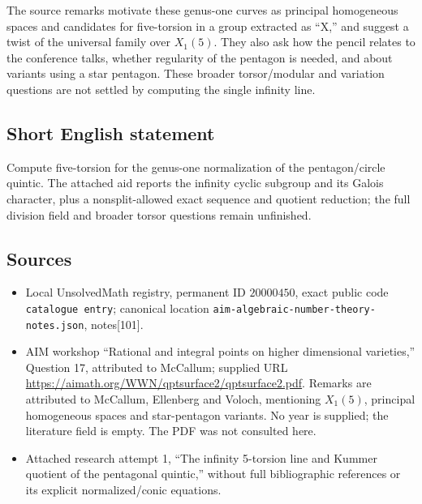 \documentclass[11pt]{article}
\begin{document}
The source remarks motivate these genus-one curves as principal homogeneous spaces and candidates for five-torsion in a group extracted as ``X,'' and suggest a twist of the universal family over \(X_1(5)\). They also ask how the pencil relates to the conference talks, whether regularity of the pentagon is needed, and about variants using a star pentagon. These broader torsor/modular and variation questions are not settled by computing the single infinity line.
\subsection{Short English statement}
Compute five-torsion for the genus-one normalization of the pentagon/circle quintic. The attached aid reports the infinity cyclic subgroup and its Galois character, plus a nonsplit-allowed exact sequence and quotient reduction; the full division field and broader torsor questions remain unfinished.
\subsection{Sources}
\begin{itemize}
\item Local UnsolvedMath registry, permanent ID \(20000450\), exact public code \texttt{catalogue entry}; canonical location \texttt{aim-algebraic-number-theory-notes.json}, notes[101].
\item AIM workshop ``Rational and integral points on higher dimensional varieties,'' Question 17, attributed to McCallum; supplied URL \url{https://aimath.org/WWN/qptsurface2/qptsurface2.pdf}. Remarks are attributed to McCallum, Ellenberg and Voloch, mentioning \(X_1(5)\), principal homogeneous spaces and star-pentagon variants. No year is supplied; the literature field is empty. The PDF was not consulted here.
\item Attached research attempt 1, ``The infinity 5-torsion line and Kummer quotient of the pentagonal quintic,'' without full bibliographic references or its explicit normalized/conic equations.
\end{itemize}
\end{document}
